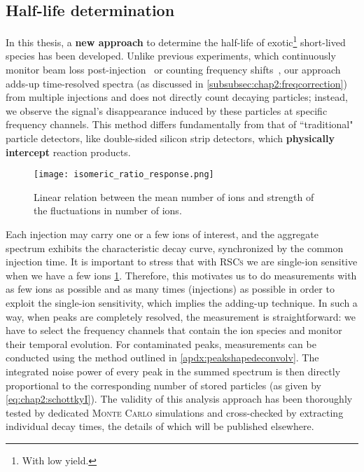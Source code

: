\subsection{Half-life determination}\label{subsec:chap2:halflifedetermination}
In this thesis, a \textbf{new approach} to determine the half-life of exotic\footnote{With low yield.} short-lived species has been developed. Unlike previous experiments, which continuously monitor beam loss post-injection~\cite{Litvinov-2003,PhysRevLett.99.262501,Litvinov-2008a} or counting frequency shifts~\cite{2013638,fatma}, our approach adds-up time-resolved spectra (as discussed in \cref{subsubsec:chap2:freqcorrection}) from multiple injections and does not directly count decaying particles; instead, we observe the signal's disappearance induced by these particles at specific frequency channels. This method differs fundamentally from that of ``traditional" particle detectors, like double-sided silicon strip detectors, which \textbf{physically intercept} reaction products.
\begin{figure}[hbt]
    \centering
    \texttt{[image: isomeric\_ratio\_response.png]}
    \caption{Linear relation between the mean number of ions and strength of the fluctuations in number of ions.}
    \label{fig:chap2:fluctuations}
\end{figure}
\newpar
Each injection may carry one or a few ions of interest, and the aggregate spectrum exhibits the characteristic decay curve, synchronized by the common injection time. 
It is important to stress that with \textsc{RSCs} we are single-ion sensitive when we have a few ions \cref{fig:chap2:fluctuations}. Therefore, this motivates us to do measurements with as few ions as possible and as many times (injections) as possible in order to exploit the single-ion sensitivity, which implies the adding-up technique.
\newpar
In such a way, when peaks are completely resolved, the measurement is straightforward: we have to select the frequency channels that contain the ion species and monitor their temporal evolution. For contaminated peaks, measurements can be conducted using the method outlined in \cref{apdx:peakshapedeconvolv}.
The integrated noise power of every peak in the summed spectrum is then directly proportional to the corresponding number of stored particles (as given by \cref{eq:chap2:schottkyI}).
The validity of this analysis approach has been thoroughly tested by dedicated \textsc{Monte Carlo} simulations \cite{mcshahab} and cross-checked by extracting individual decay times, the details of which will be published elsewhere.
\begin{center}
    \vspace*{1cm}
    \vspace*{\fill}
\end{center}
